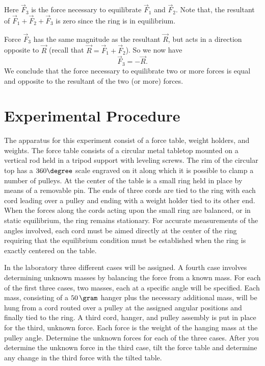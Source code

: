 Here $\vec{F}_3$ is the force necessary to equilibrate $\vec{F}_1$ and $\vec{F}_2$.  Note that, the resultant of $\vec{F}_1+\vec{F}_2+\vec{F}_3$ is zero since the ring is in equilibrium.

Force $\vec{F}_3$ has the same magnitude as the resultant $\vec{R}$, but acts in a direction opposite to $\vec{R}$ (recall that $\vec{R}=\vec{F}_1+\vec{F}_2$).  So we now have
\begin{equation}
  \vec{F}_3 = -\vec{R}.
\end{equation}
We conclude that the force necessary to equilibrate two or more forces is equal and opposite to the resultant of the two (or more) forces.














\section{Experimental Procedure}

The apparatus for this experiment consist of a force table, weight holders, and weights.  The force table consists of a circular metal tabletop mounted on a vertical rod held in a tripod support with leveling screws.  The rim of the circular top has a $360\degree$ scale engraved on it along which it is possible to clamp a number of pulleys.  At the center of the table is a small ring held in place by means of a removable pin.  The ends of three cords are tied to the ring with each cord leading over a pulley and ending with a weight holder tied to its other end.  When the forces along the cords acting upon the small ring are balanced, or in static equilibrium, the ring remains stationary.  For accurate measurements of the angles involved, each cord must be aimed directly at the center of the ring requiring that the equilibrium condition must be established when the ring is exactly centered on the table.

In the laboratory three different cases will be assigned. A fourth case involves determining unknown masses by balancing the force from a known mass. For each of the first three cases, two masses, each at a specific angle will be specified.  Each mass, consisting of a $50\,\gram$ hanger plus the necessary additional mass, will be hung from a cord routed over a pulley at the assigned angular positions and finally tied to the ring.  A third cord, hanger, and pulley assembly is put in place for the third, unknown force.  Each force is the weight of the hanging mass at the pulley angle.  Determine the unknown forces for each of the three cases.  After you determine the unknown force in the third case, tilt the force table and determine any change in the third force with the tilted table.


